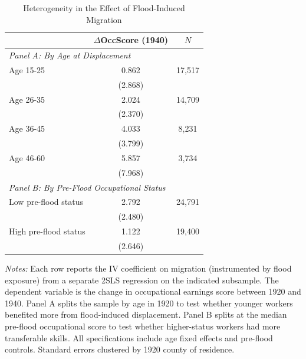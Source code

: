 \begin{table}[t]
\centering
\caption{Heterogeneity in the Effect of Flood-Induced Migration}
\label{tab:heterogeneity}
\begin{tabular}{lcc}
\toprule
 & $\Delta$OccScore (1940) & $N$ \\
\midrule
\multicolumn{3}{l}{\textit{Panel A: By Age at Displacement}} \\
Age 15-25 & 0.862 & 17,517 \\
 & (2.868) & \\
Age 26-35 & 2.024 & 14,709 \\
 & (2.370) & \\
Age 36-45 & 4.033 & 8,231 \\
 & (3.799) & \\
Age 46-60 & 5.857 & 3,734 \\
 & (7.968) & \\
\midrule
\multicolumn{3}{l}{\textit{Panel B: By Pre-Flood Occupational Status}} \\
Low pre-flood status & 2.792 & 24,791 \\
 & (2.480) & \\
High pre-flood status & 1.122 & 19,400 \\
 & (2.646) & \\
\bottomrule
\end{tabular}
\par\vspace{0.3em}
{\footnotesize
\textit{Notes:} Each row reports the IV coefficient on migration (instrumented by flood exposure) from a separate 2SLS regression on the indicated subsample. The dependent variable is the change in occupational earnings score between 1920 and 1940. Panel A splits the sample by age in 1920 to test whether younger workers benefited more from flood-induced displacement. Panel B splits at the median pre-flood occupational score to test whether higher-status workers had more transferable skills. All specifications include age fixed effects and pre-flood controls. Standard errors clustered by 1920 county of residence.
}
\end{table}

